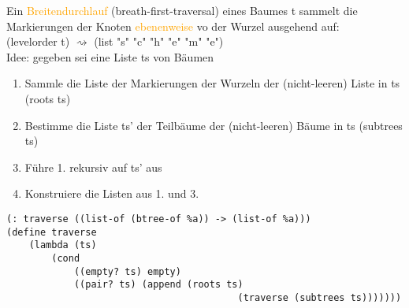 \documentclass[paper=a4, fontsize=11pt]{scrartcl}
\numberwithin{equation}{section}
\numberwithin{figure}{section}
\numberwithin{table}{section}
\begin{document}
\begin{lstlistig}
Ein \textcolor{orange}{Breitendurchlauf} (breath-first-traversal) eines Baumes t sammelt die Markierungen der Knoten \textcolor{orange}{ebenenweise}  vo der Wurzel ausgehend auf: \\


(levelorder t) $\rightsquigarrow$ (list "s" "c" "h" "e" "m" "e") \\

Idee: gegeben sei eine Liste ts von Bäumen \\
\begin{enumerate}
\item Sammle die Liste der Markierungen der Wurzeln der (nicht-leeren) Liste in ts (roots ts)
\item Bestimme die Liste ts' der Teilbäume der (nicht-leeren) Bäume in ts (subtrees ts)
\item Führe 1. rekursiv auf ts' aus
\item Konstruiere die Listen aus 1. und 3.
\end{enumerate}


\begin{lstlisting}
(: traverse ((list-of (btree-of %a)) -> (list-of %a)))
(define traverse
    (lambda (ts)
        (cond
            ((empty? ts) empty)
            ((pair? ts) (append (roots ts)
                                         (traverse (subtrees ts)))))))
\end{lstlisting}


\end{lstlistig}
\end{document}
